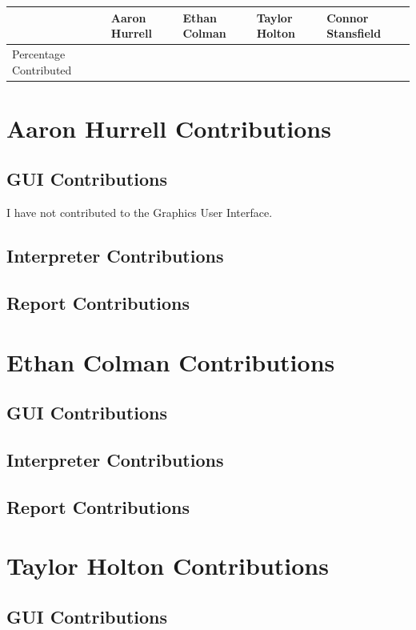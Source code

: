 \documentclass[a4paper, oneside, 11pt]{report}
\begin{document}
    \begin{table}[h]
        \begin{tabular}{|l|l|l|l|l|}
            \hline
            & Aaron Hurrell & Ethan Colman & Taylor Holton & Connor Stansfield \\ \hline
            Percentage Contributed &               &              &               &                  \\ \hline
        \end{tabular}
    \end{table}

    \section{Aaron Hurrell Contributions}
    \subsection{GUI Contributions}
    I have not contributed to the Graphics User Interface.
    \subsection{Interpreter Contributions}
    \subsection{Report Contributions}

    \section{Ethan Colman Contributions}
    \subsection{GUI Contributions}
    \subsection{Interpreter Contributions}
    \subsection{Report Contributions}

    \section{Taylor Holton Contributions}
    \subsection{GUI Contributions}
\end{document}

